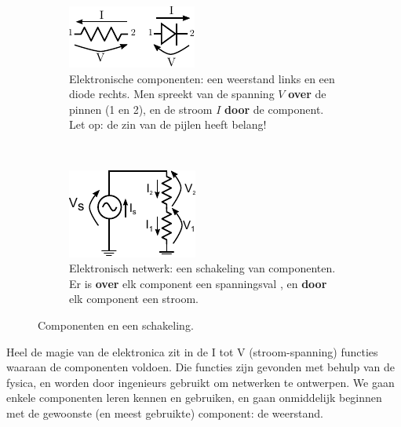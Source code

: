 \documentclass{article}
\begin{document}
		\begin{figure}[hbtp]
			\centering
			\begin{subfigure}[b]{0.45\linewidth}
				\centering
				\includegraphics[width=0.8\linewidth]{componenten}
				\caption{Elektronische componenten: een weerstand links en een diode rechts. Men spreekt van de spanning $V$ \textbf{over} de pinnen (1 en 2), en de stroom $I$ \textbf{door} de component. Let op: de zin van de pijlen heeft belang!}
				\label{subfig:componenten}
			\end{subfigure}
			~
			\begin{subfigure}[b]{0.45\linewidth}
				\centering
				\includegraphics[width=0.8\linewidth]{weerstandsdeler}
				\caption{Elektronisch netwerk: een schakeling van componenten. Er is \textbf{over} elk component een spanningsval , en \textbf{door} elk component een stroom.}
				\label{subfig:netwerk}
			\end{subfigure}
			\caption{Componenten en een schakeling. }
			\label{fig:component_en_schakeling}
		\end{figure}

		Heel de magie van de elektronica zit in de I tot V (stroom-spanning) functies waaraan de componenten voldoen. Die functies zijn gevonden met behulp van de fysica, en worden door ingenieurs gebruikt om netwerken te ontwerpen. We gaan enkele componenten leren kennen en gebruiken, en gaan onmiddelijk beginnen met de gewoonste (en meest gebruikte) component: de weerstand.
\end{document}
